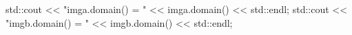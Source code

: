 std::cout << "imga.domain() = " << imga.domain()
<< std::endl;
std::cout << "imgb.domain() = " << imgb.domain()
<< std::endl;

